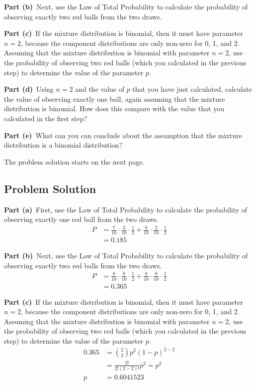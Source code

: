 \documentclass[12pt]{article}
\theoremstyle{definition}
\begin{document}
\bigskip
\noindent
{\bf Part (b)}\ Next, use the Law of Total Probability to calculate the probability of observing exactly two red balls from the two draws.

\bigskip
\noindent
{\bf Part (c)}\ If the mixture distribution is binomial, then it must have parameter $n = 2$, because the component distributions are only non-zero for 0, 1, and 2. Assuming that the  mixture distribution is binomial with parameter $n = 2$, use the probability of observing two red balls (which you calculated in the previous step) to determine the value of the parameter $p$.

\bigskip
\noindent
{\bf Part (d)}\ Using $n = 2$ and the value of $p$ that you have just calculated, calculate the value of observing exactly one ball, again assuming that the mixture distribution is binomial. How does this compare with the value that you calculated in the first step?

\bigskip
\noindent
{\bf Part (e)}\ What can you can conclude about the assumption that the mixture distribution is a binomial distribution?



\bigskip
\noindent
The problem solution starts on the next page.

\newpage
\subsection*{Problem Solution}

\noindent
{\bf Part (a)}\ First, use the Law of Total Probability to calculate the probability of observing exactly one red ball from the two draws.
\begin{align*}
P &= \frac{7}{10}\cdot\frac{3}{10}\cdot \frac{1}{2} + \frac{8}{10}\cdot\frac{2}{10}\cdot \frac{1}{2}\\
&= 0.185
\end{align*}

\vspace{3.5in}
\noindent
{\bf Part (b)}\ Next, use the Law of Total Probability to calculate the probability of observing exactly two red balls from the two draws.
\begin{align*}
P &= \frac{8}{10} \cdot \frac{8}{10}\cdot \frac{1}{2} + \frac{8}{10} \cdot \frac{8}{10}\cdot \frac{1}{2}\\
&= 0.365
\end{align*}


\newpage
\noindent
{\bf Part (c)}\ If the mixture distribution is binomial, then it must have parameter $n = 2$, because the component distributions are only non-zero for 0, 1, and 2. Assuming that the  mixture distribution is binomial with parameter $n = 2$, use the probability of observing two red balls (which you calculated in the previous step) to determine the value of the parameter $p$.
\begin{align*}
0.365 &= \binom{2}{2} p^2(1 - p) ^{2-2}\\
&= \frac{2!}{2!(2-2)!}p^2 = p^2\\
p&= 0.6041523
\end{align*}
\end{document}
